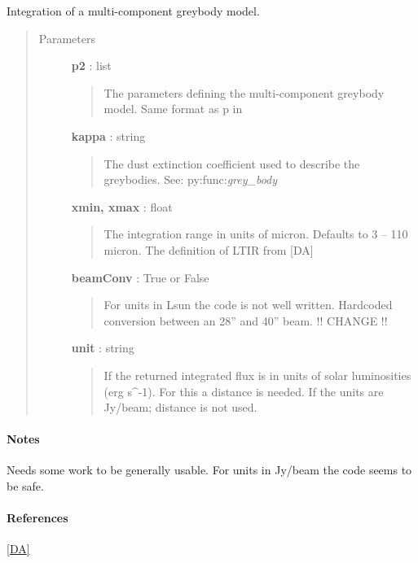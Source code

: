 \documentclass[a4paper,10pt,english]{sphinxmanual}
\begin{document}

\begin{fulllineitems}
\label{functions:astrolyze.functions.astro_functions.LTIR}
Integration of a multi-component greybody model.
\begin{quote}\begin{description}
\item[{Parameters }] \leavevmode
\textbf{p2} : list
\begin{quote}

The parameters defining the multi-component greybody model. Same format
as p in
\end{quote}

\textbf{kappa} : string
\begin{quote}

The dust extinction coefficient used to describe the greybodies. See:
py:func:\emph{grey\_body}
\end{quote}

\textbf{xmin, xmax} : float
\begin{quote}

The integration range in units of micron. Defaults to 3 -- 110 micron.
The definition of LTIR from {[}DA{]}
\end{quote}

\textbf{beamConv} : True or False
\begin{quote}

For units in Lsun the code is not well written. Hardcoded conversion
between an 28'' and 40'' beam. !! CHANGE !!
\end{quote}

\textbf{unit} : string
\begin{quote}

If  the returned integrated flux is in units of solar
luminosities (erg s\textasciicircum{}-1). For this a distance is needed. If 
the units are Jy/beam; distance is not used.
\end{quote}

\end{description}\end{quote}
\paragraph{Notes}

Needs some work to be generally usable. For units in Jy/beam the code seems
to be safe.
\paragraph{References}

{\hyperref[functions:da]{{[}DA{]}}}

\end{fulllineitems}
\end{document}
